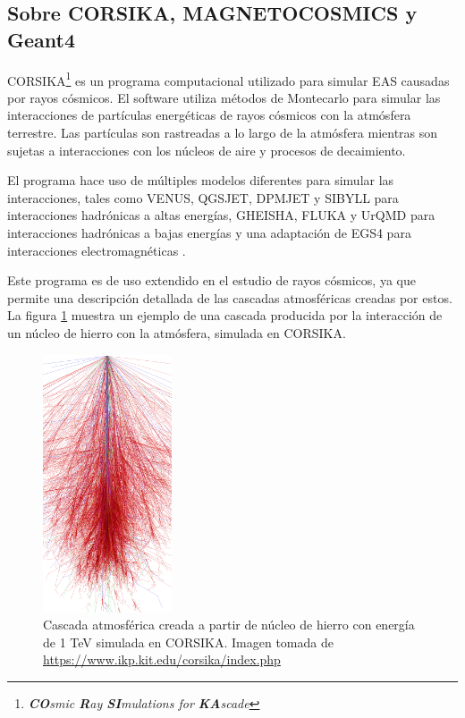 \documentclass[12pt]{report}
\begin{document}

\subsection*{Sobre CORSIKA, MAGNETOCOSMICS y Geant4}

CORSIKA\footnote{\textit{\textbf{CO}smic \textbf{R}ay \textbf{SI}mulations for \textbf{KA}scade}} es un programa computacional utilizado para simular EAS causadas por rayos cósmicos. El software utiliza métodos de Montecarlo para simular las interacciones de partículas energéticas de rayos cósmicos con la atmósfera terrestre. Las partículas son rastreadas a lo largo de la atmósfera mientras son sujetas a interacciones con los núcleos de aire y procesos de decaimiento.

El programa hace uso de múltiples modelos diferentes para simular las interacciones, tales como VENUS, QGSJET, DPMJET y SIBYLL para interacciones hadrónicas a altas energías, GHEISHA, FLUKA y UrQMD para interacciones hadrónicas a bajas energías y una adaptación de EGS4 para interacciones electromagnéticas \cite{heck1998corsika}.

Este programa es de uso extendido en el estudio de rayos cósmicos, ya que permite una descripción detallada de las cascadas atmosféricas creadas por estos. La figura \ref{fig:ironcascade} muestra un ejemplo de una cascada producida por la interacción de un núcleo de hierro con la atmósfera, simulada en CORSIKA.

\begin{figure}
    \centering
    \includegraphics[width=1.5in]{images/ironcascade.png}
    \caption{Cascada atmosférica creada a partir de núcleo de hierro con energía de 1 TeV simulada en CORSIKA. Imagen tomada de \url{https://www.ikp.kit.edu/corsika/index.php}}
    \label{fig:ironcascade}
\end{figure}
\end{document}

